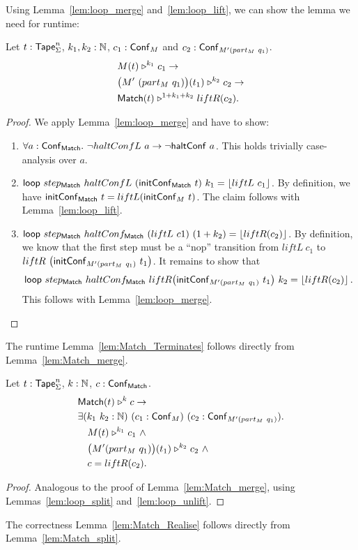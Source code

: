 Using Lemma~\ref{lem:loop_merge} and~\ref{lem:loop_lift}, we can show the lemma we need for runtime:
\begin{lemma}
  \label{lem:Match_merge}
  Let $t : \mathsf{Tape}_\Sigma^n$, $k_1, k_2:\mathbb{N}$, $c_1 : \mathsf{Conf}_M$ and $c_2 : \mathsf{Conf}_{M'(part_M~q_1)}$.
  \begin{alignat*}{1}
    & M(t) \mathrel{\triangleright}^{k_1} c_1 \rightarrow\\
    & \bigl( M'~(part_M~q_1) \bigr) (t_1) \mathrel{\triangleright}^{k_2} c_2 \rightarrow\\
    & \mathsf{Match}(t) \mathrel{\triangleright}^{1+k_1+k_2} liftR(c_2).
  \end{alignat*}
\end{lemma}
\begin{proof}
  We apply Lemma~\ref{lem:loop_merge} and have to show:
  \begin{enumerate}
  \item $\forall a:\mathsf{Conf}_{\mathsf{Match}}.~ \lnot haltConfL~a \rightarrow \lnot \mathsf{haltConf}~a$.  This holds trivially case-analysis over $a$.
  \item $\mathsf{loop}~step_{\mathsf{Match}}~haltConfL~(\mathsf{initConf}_{\mathsf{Match}}~t)~k_1 =
    \left\lfloor {liftL~c_1} \right\rfloor$.  By definition, we have $\mathsf{initConf}_{\mathsf{Match}}~t=liftL(\mathsf{initConf}_M~t)$.  The claim follows with Lemma~\ref{lem:loop_lift}.
  \item $\mathsf{loop}~step_{\mathsf{Match}}~haltConf_{\mathsf{Match}}~(liftL~c1)~(1+k_2) =
    \left\lfloor {liftR(c_2)} \right\rfloor$.  By definition, we know that the first step must be a ``nop'' transition from
    $liftL~c_1$ to\\
    $liftR~\bigl(\mathsf{initConf}_{M'(part_M~q_1)}~t_1 \bigr)$.  It remains to show that
    $$\mathsf{loop}~step_{\mathsf{Match}}~haltConf_{\mathsf{Match}}~liftR \bigl(\mathsf{initConf}_{M'(part_M~q_1)}~t_1 \bigr)~k_2 = \left\lfloor {liftR(c_2)} \right\rfloor.$$
    This follows with Lemma~\ref{lem:loop_merge}.
  \end{enumerate}
\end{proof}
The runtime Lemma~\ref{lem:Match_Terminates} follows directly from Lemma~\ref{lem:Match_merge}.

\begin{lemma}
  \label{lem:Match_split}
  Let $t : \mathsf{Tape}_\Sigma^n$, $k : \mathbb{N}$, $c : \mathsf{Conf}_{\mathsf{Match}}$.
  \begin{align*}
    & \mathsf{Match}(t) \mathrel{\triangleright}^k c \rightarrow \\
    & \exists (k_1~k_2 : \mathbb{N})~(c_1 : \mathsf{Conf}_M)~(c_2 : \mathsf{Conf}_{M'(part_M~q_1)}). \\
    & \quad M(t) \mathrel{\triangleright}^{k_1} c_1 ~\land~ \\
    & \quad \bigl( M' (part_M~q_1) \bigr) (t_1) \mathrel{\triangleright}^{k_2} c_2 ~\land~ \\
    & \quad c = liftR(c_2).
  \end{align*}
\end{lemma}
\begin{proof}
  Analogous to the proof of Lemma~\ref{lem:Match_merge}, using Lemmas~\ref{lem:loop_split} and~\ref{lem:loop_unlift}.
\end{proof}
The correctness Lemma~\ref{lem:Match_Realise} follows directly from Lemma~\ref{lem:Match_split}.


